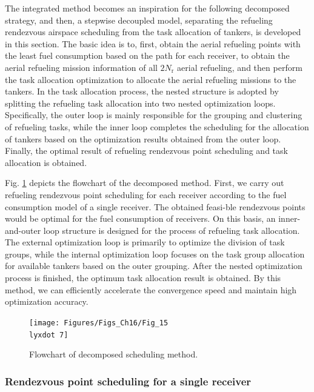 The integrated method becomes an inspiration for the following decomposed strategy, and then, a stepwise decoupled model, separating the refueling rendezvous airspace scheduling from the task allocation of tankers, is developed in this section. The basic idea is to, first, obtain the aerial refueling points with the least fuel consumption based on the path for each receiver, to obtain the aerial refueling mission information of all  $2N_\text{r}$ aerial refueling, and then perform the task allocation optimization to allocate the aerial refueling missions to the tankers. In the task allocation process, the nested structure is adopted by splitting the refueling task allocation into two nested optimization loops. Specifically, the outer loop is mainly responsible for the grouping and clustering of refueling tasks, while the inner loop completes the scheduling for the allocation of tankers based on the optimization results obtained from the outer loop. Finally, the optimal result of refueling rendezvous point scheduling and task allocation is obtained.

Fig. \ref{Fig_15.7} depicts the flowchart of the decomposed method. First, we carry out refueling rendezvous point scheduling for each receiver according to the fuel consumption model of a single receiver. The obtained feasi-ble rendezvous points would be optimal for the fuel consumption of receivers. On this basis, an inner-and-outer loop structure is designed for the process of refueling task allocation. The external optimization loop is primarily to optimize the division of task groups, while the internal optimization loop focuses on the task group allocation for available tankers based on the outer grouping. After the nested optimization process is finished, the optimum task allocation result is obtained. By this method, we can efficiently accelerate the convergence speed and maintain high optimization accuracy.

\begin{figure}
	\begin{centering}
		\texttt{[image: Figures/Figs\_Ch16/Fig\_15\\lyxdot 7]}
		\par\end{centering}
	\caption{Flowchart of decomposed scheduling method.}
	\centering{}\label{Fig_15.7}
\end{figure}


\subsubsection{Rendezvous point scheduling for a single receiver}

